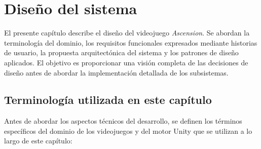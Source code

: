 ﻿\chapter{Diseño del sistema}


El presente capítulo describe el diseño del videojuego \textit{Ascension}. Se abordan la terminología del dominio, los requisitos funcionales expresados mediante historias de usuario, la propuesta arquitectónica del sistema y los patrones de diseño aplicados. El objetivo es proporcionar una visión completa de las decisiones de diseño antes de abordar la implementación detallada de los subsistemas.

\section{Terminología utilizada en este capítulo}


Antes de abordar los aspectos técnicos del desarrollo, se definen los términos específicos del dominio de los videojuegos y del motor Unity que se utilizan a lo largo de este capítulo:

